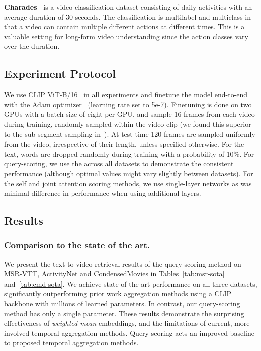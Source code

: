 \noindent\textbf{Charades~\cite{sigurdsson2016hollywood}} is a video classification dataset consisting of daily activities with an average duration of 30 seconds. The classification is multilabel and multiclass in that a video can contain multiple different actions at different times. This is a valuable setting for long-form video understanding since the action classes vary over the duration.

\subsection{Experiment Protocol}
\label{subsec:protocol}
We use CLIP ViT-B/16~\cite{radford2021learning} in all experiments and finetune the model end-to-end with the Adam optimizer~\cite{DBLP:journals/corr/KingmaB14} (learning rate set to 5e-7). Finetuning is done on two GPUs with a batch size of eight per GPU, and sample 16 frames from each video during training, randomly sampled within the video clip (we found this superior to the sub-segment sampling in~\cite{Bain21}). At test time 120 frames are sampled uniformly from the video, irrespective of their length, unless specified otherwise. For the text, words are dropped randomly during training with a probability of 10\%. For query-scoring, we use the  across all datasets to demonstrate the consistent performance (although optimal values might vary slightly between datasets). For the self and joint attention scoring methods, we use single-layer networks as was minimal difference in performance when using additional layers.
\subsection{Results}
\label{subsec:results}
\subsubsection{Comparison to the state of the art.}
We present the text-to-video retrieval results of the query-scoring method on MSR-VTT, ActivityNet and CondensedMovies in Tables~\ref{tab:msr-sota} and~\ref{tab:cmd-sota}. We achieve state-of-the art performance on all three datasets, significantly outperforming prior work aggregation methods using a CLIP backbone with millions of learned parameters. In contrast, our query-scoring method has only a single parameter. These results demonstrate the surprising effectiveness of \textit{weighted-mean} embeddings, and the limitations of current, more involved temporal aggregation methods. Query-scoring acts an improved baseline to proposed temporal aggregation methods.


